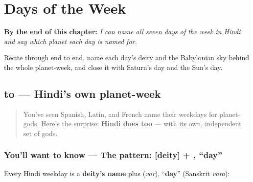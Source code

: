 
\chapter{Days of the Week}
\label{ch:hi-days-of-the-week}

\begin{chapteropening}
\textbf{By the end of this chapter:} \emph{I can name all seven days of the week in Hindi and say which planet each day is named for.}

Recite  through  end to end, name each day's deity and the Babylonian sky behind the whole planet-week, and close it with Saturn's day and the Sun's day.
\end{chapteropening}

\section[\texorpdfstring{\hi{सोमवार} \hi{मंगलवार} … (somavār …)}{सोमवार मंगलवार … (somavār …)}]{ to  — Hindi's own planet-week}

\label{lesson:HI-C10-somavaar-shukravaar}



\begin{quote}
You've seen Spanish, Latin, and French name their weekdays for planet-gods. Here's the surprise: \textbf{Hindi does too} — with its own, independent set of gods.
\end{quote}

\subsection*{You'll want to know — The pattern: {[}deity{]} + , \textquotedblleft{}day\textquotedblright{}}
Every Hindi weekday is a \textbf{deity's name} plus \textbf{} (\emph{vār}), \textquotedblleft{}\textbf{day}\textquotedblright{} (Sanskrit \emph{vāra}):

